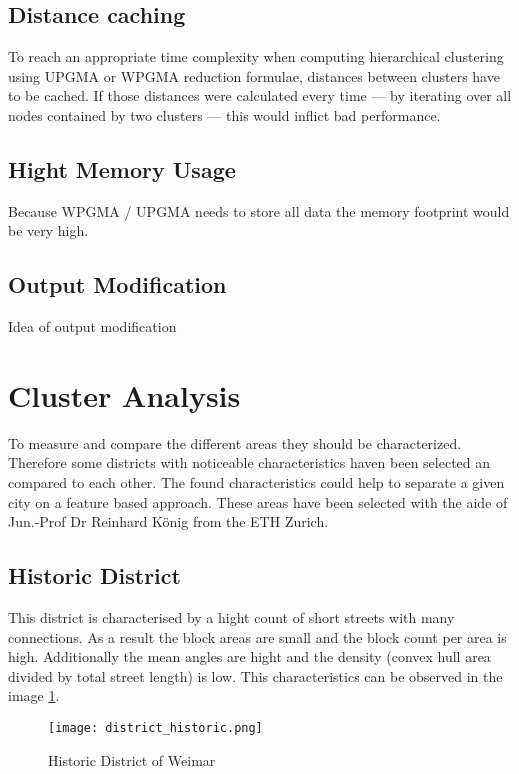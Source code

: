 \subsection{Distance caching}
To reach an appropriate time complexity when computing hierarchical clustering using \acrshort{UPGMA} or \acrshort{WPGMA} reduction formulae, distances between clusters have to be cached. If those distances were calculated every time --- by iterating over all nodes contained by two clusters --- this would inflict bad performance.

\subsection{Hight Memory Usage}
Because WPGMA / UPGMA needs to store all data the memory footprint would be very high. %

\subsection{Output Modification}
Idea of output modification

\pagebreak
\section{Cluster Analysis}
\label{sec:concept_cluster_analysis}
To measure and compare the different areas they should be characterized. Therefore some districts with noticeable characteristics haven been selected an compared to each other. The found characteristics could help to separate a given city on a feature based approach.
These areas have been selected with the aide of Jun.-Prof Dr Reinhard König from the ETH Zurich.

\subsection{Historic District}
\label{sec:historyDistinct}
This district is characterised by a hight count of short streets with many connections. As a result the block areas are small and the block count per area is high. Additionally the mean angles are hight and the density (convex hull area divided by total street length) is low. This characteristics can be observed in the image \ref{fig:historic_district}.

\begin{figure}[!ht]
    \centering
    \begin{mdframed}[style=mdthight, userdefinedwidth=0.4\textwidth, align=center]
        \texttt{[image: district\_historic.png]}
    \end{mdframed}
    \caption{Historic District of Weimar}
    \label{fig:historic_district}
\end{figure}

